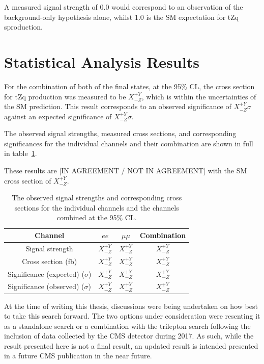 A measured signal strength of 0.0 would correspond to an observation of the background-only hypothesis alone, whilst 1.0 is the SM expectation for tZq sproduction.

\section{Statistical Analysis Results}
For the combination of both of the final states, at the 95\% CL, the cross section for tZq production was measured to be $X^{+Y}_{-Z}$, which is within the uncertainties of the SM prediction.
This result corresponds to an observed significance of $X_{-Z}^{+Y} \sigma$ against an expected significance of $X_{-Z}^{+Y} \sigma$.

The observed signal strengths, measured cross sections, and corresponding significances for the individual channels and their combination are shown in full in table~\ref{tab:shapetxs}.

These results are [IN AGREEMENT / NOT IN AGREEMENT] with the SM cross section of  $X^{+Y}_{-Z}$.

\begin{table}[!h]
   \centering
   \caption{The observed signal strengths and corresponding cross sections for
   the individual channels and the channels combined at the 95\% CL.}
   \begin{tabular}{cccc}
       \hline
       Channel & $ee$ & $\mu\mu$ & \textbf{Combination} \\
        \hline
       Signal strength & $X_{-Z}^{+Y}$ & $X_{-Z}^{+Y}$ & $X_{-Z}^{+Y}$ \\
       Cross section (fb) & $X_{-Z}^{+Y}$ & $X_{-Z}^{+Y}$ & $X_{-Z}^{+Y}$ \\
       Significance (expected) ($\sigma$) & $X_{-Z}^{+Y}$ & $X_{-Z}^{+Y}$ & $X_{-Z}^{+Y}$ \\
       Significance (observed) ($\sigma$) & $X_{-Z}^{+Y}$ & $X_{-Z}^{+Y}$ & $X_{-Z}^{+Y}$ \\
    \end{tabular}
   \label{tab:shapetxs}
\end{table}

At the time of writing this thesis, discussions were being undertaken on how best to take this search forward.
The two options under consideration were resenting it as a standalone search or a combination with the trilepton search following the inclusion of data collected by the CMS detector during 2017.
As such, while the result presented here is not a final result, an updated result is intended presented in a future CMS publication in the near future.

